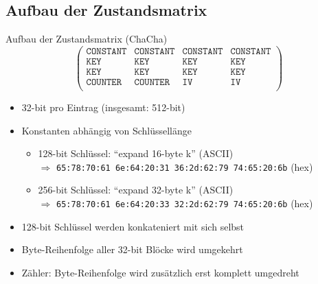 \documentclass{beamer}
\begin{document}
\subsection{Aufbau der Zustandsmatrix}
\begin{frame}{Aufbau der Zustandsmatrix (ChaCha)}
\begin{equation*}
\begin{pmatrix}
\texttt{CONSTANT}& \texttt{CONSTANT} & \texttt{CONSTANT} & \texttt{CONSTANT} \\
\texttt{KEY} & \texttt{KEY} & \texttt{KEY} & \texttt{KEY} \\
\texttt{KEY} & \texttt{KEY} & \texttt{KEY} & \texttt{KEY} \\
\texttt{COUNTER} & \texttt{COUNTER} & \texttt{IV} & \texttt{IV} \\
\end{pmatrix}
\end{equation*}
\begin{itemize}
\item 32-bit pro Eintrag (insgesamt: 512-bit)
\item Konstanten abhängig von Schlüssellänge
\begin{itemize}
\item 128-bit Schlüssel: ``expand 16-byte k'' (ASCII) \\
$\Rightarrow$ \texttt{65:78:70:61 6e:64:20:31 36:2d:62:79 74:65:20:6b} (hex)
\item 256-bit Schlüssel: ``expand 32-byte k'' (ASCII) \\
$\Rightarrow$ \texttt{65:78:70:61 6e:64:20:33 32:2d:62:79 74:65:20:6b} (hex)
\end{itemize}
\item 128-bit Schlüssel werden konkateniert mit sich selbst
\item Byte-Reihenfolge aller 32-bit Blöcke wird umgekehrt
\item Zähler: Byte-Reihenfolge wird zusätzlich erst komplett umgedreht
\end{itemize}
\end{frame}
\end{document}
